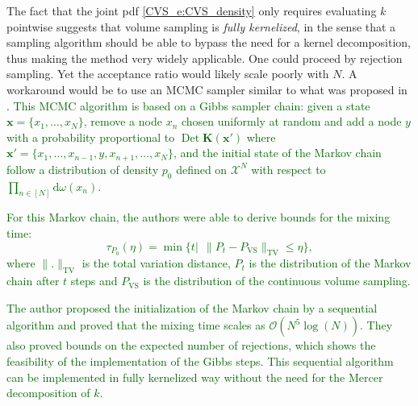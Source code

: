\documentclass[twoside,11pt]{book}
\newcommand{\rev}[1]{\textcolor{darkgreen}{#1}}
\newtheorem{theorem}{Theorem}
\numberwithin{theorem}{chapter}
\numberwithin{definition}{chapter}
\numberwithin{proposition}{chapter}
\numberwithin{corollary}{chapter}
\numberwithin{example}{chapter}
\numberwithin{lemma}{chapter}
\numberwithin{assumption}{chapter}
\DeclareMathOperator{\Det}{Det}
\begin{document}
The fact that the joint pdf \eqref{CVS_e:CVS_density} only requires evaluating $k$ pointwise suggests that volume sampling is \emph{fully kernelized}, in the sense that a sampling algorithm should be able to bypass the need for a kernel decomposition, thus making the method very widely applicable.
One could proceed by rejection sampling. Yet the acceptance ratio would likely scale poorly with $N$.  A workaround would be to use an MCMC sampler similar to what was proposed in \citep{ReGh19}.
\rev{
This MCMC algorithm is based on a Gibbs sampler chain: given a state $\bm{x} = \{x_{1}, \dots , x_{N} \}$, remove a node $x_{n}$ chosen uniformly at random and add a node $y$ with a probability proportional to $\Det \bm{K}(\bm{x}')$ where $\bm{x}' = \{x_{1}, \dots, x_{n-1}, y,x_{n+1}, \dots, x_{N} \}$, and the initial state of the Markov chain follow a distribution of density $p_{0}$ defined on $\mathcal{X}^{N}$ with respect to $\prod\limits_{n \in [N]} \mathrm{d}\omega(x_{n})$. }

\rev{For this Markov chain, the authors were able to derive bounds for the mixing time:
$$\tau_{P_{0}}(\eta) = \min \{t |\:\: \|P_{t} - P_{\mathrm{VS}}\|_{\mathrm{TV}} \leq \eta \},$$ where $\|.\|_{\mathrm{TV}}$ is the total variation distance, $P_{t}$ is the distribution of the Markov chain after $t$ steps and $P_{\mathrm{VS}}$ is the distribution of the continuous volume sampling. }



\rev{ The author proposed the initialization of the Markov chain by a sequential algorithm and proved that the mixing time scales as $\mathcal{O}(N^{5}\log(N))$.
They also proved bounds on the expected number of rejections, which shows the feasibility of the implementation of the Gibbs steps.
  This sequential algorithm can be implemented in fully kernelized way without the need for the Mercer decomposition of $k$.}
\end{document}
